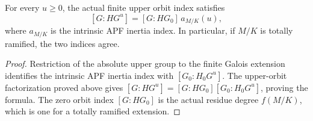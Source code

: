 \begin{lemma}
\label{fw:finite-upper-orbit-apf-index}
\leanok
For every $u\geq0$, the actual finite upper orbit index satisfies
\[
 [G:HG^u]=[G:HG_0]\,a_{M/K}(u),
\]
where $a_{M/K}$ is the intrinsic APF inertia index. In particular,
if $M/K$ is totally ramified, the two indices agree.
\end{lemma}
\begin{proof}
Restriction of the absolute upper group to the finite Galois
extension identifies the intrinsic APF inertia index with
$[G_0:H_0G^u]$. The upper-orbit factorization proved above gives
$[G:HG^u]=[G:HG_0][G_0:H_0G^u]$, proving the formula.
The zero orbit index $[G:HG_0]$ is the actual residue degree
$f(M/K)$, which is one for a totally ramified extension.
\end{proof}


